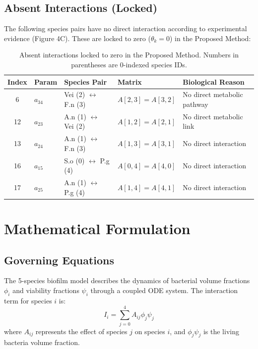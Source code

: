 \documentclass[11pt,a4paper]{article}
\begin{document}
\subsection{Absent Interactions (Locked)}

The following species pairs have no direct interaction according to experimental evidence (Figure 4C). These are locked to zero ($\theta_k = 0$) in the Proposed Method:

\begin{table}[h]
\centering
\begin{tabular}{cllll}
\toprule
\textbf{Index} & \textbf{Param} & \textbf{Species Pair} & \textbf{Matrix} & \textbf{Biological Reason} \\
\midrule
6 & $a_{34}$ & Vei (2) $\leftrightarrow$ F.n (3) & $A[2,3]=A[3,2]$ & No direct metabolic pathway \\
12 & $a_{23}$ & A.n (1) $\leftrightarrow$ Vei (2) & $A[1,2]=A[2,1]$ & No direct metabolic link \\
13 & $a_{24}$ & A.n (1) $\leftrightarrow$ F.n (3) & $A[1,3]=A[3,1]$ & No direct interaction \\
16 & $a_{15}$ & S.o (0) $\leftrightarrow$ P.g (4) & $A[0,4]=A[4,0]$ & No direct interaction \\
17 & $a_{25}$ & A.n (1) $\leftrightarrow$ P.g (4) & $A[1,4]=A[4,1]$ & No direct interaction \\
\bottomrule
\end{tabular}
\caption{Absent interactions locked to zero in the Proposed Method. Numbers in parentheses are 0-indexed species IDs.}
\label{tab:locked}
\end{table}

\section{Mathematical Formulation}

\subsection{Governing Equations}

The 5-species biofilm model describes the dynamics of bacterial volume fractions $\phi_i$ and viability fractions $\psi_i$ through a coupled ODE system. The interaction term for species $i$ is:
\begin{equation}
I_i = \sum_{j=0}^{4} A_{ij} \phi_j \psi_j
\end{equation}
where $A_{ij}$ represents the effect of species $j$ on species $i$, and $\phi_j \psi_j$ is the living bacteria volume fraction.
\end{document}
